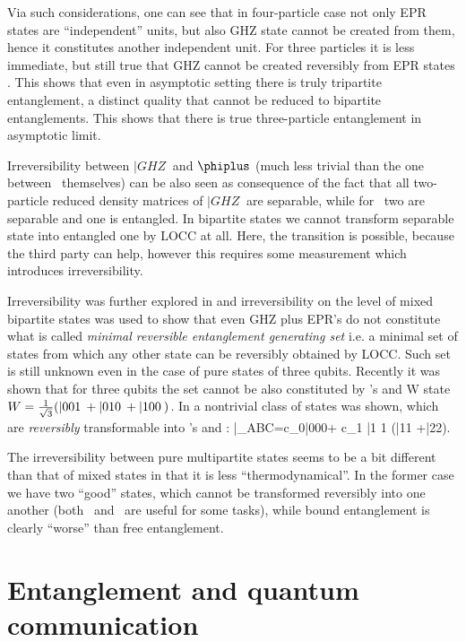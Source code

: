 \documentclass[twocolumn,aps,rmp]{revtex4}
\begin{document}
Via such considerations, one can see that in four-particle case not
only EPR states are ``independent'' units, but also GHZ state cannot
be created from them, hence it constitutes another independent unit.
For three particles it is less immediate, but still true that GHZ
cannot be created reversibly from EPR states \cite{LPSW1999}. This
shows that even in asymptotic setting there is truly tripartite
entanglement, a distinct quality that cannot be reduced to bipartite
entanglements.  This shows that there is true three-particle
entanglement in asymptotic limit.

Irreversibility between $|GHZ\>$  and $\phiplus$ (much less trivial than the one between \eprstates\
themselves) can be also seen as consequence of
the fact that all two-particle reduced density matrices of $|GHZ\>$ are separable,
while for \eprstates\ two are separable and one is entangled.
In bipartite states we cannot transform separable state into entangled one by LOCC
at all. Here, the transition is possible, because the third party can help,
however this requires some measurement which introduces irreversibility.

Irreversibility was further explored in \cite{AcinVC-mregs}
and irreversibility on the level of mixed bipartite states was used
to show that even GHZ plus EPR's do not constitute what is called
{\it minimal reversible entanglement generating set}
\cite{BPRST-mregs} i.e. a minimal set of states from which any other
state can be reversibly obtained  by LOCC. Such set is still unknown
even in the case of pure states of three qubits. Recently it was
shown \cite{IshizakaP-asym} that for three qubits the set cannot be
also constituted by \epr's and W state $W={1\over \sqrt3}(|001\>
+|010\>+|100\>)$. In \cite{VidalDC2000-epr-ghz} a nontrivial class
of states was shown, which are {\it reversibly} transformable into
\epr's and \ghz:
\be |\psi\>_{ABC}=c_0|000\>+ c_1 |1\> {1\over
{}}(|11\> +|22\>). \ee

The irreversibility between pure multipartite states seems to be a
bit different than that of mixed states in that it is less
``thermodynamical''. In the former case we have two ``good'' states,
which cannot be transformed reversibly into one another (both \eprstate\
and \ghzstate\ are useful for some tasks), while bound entanglement is
clearly ``worse'' than free entanglement.


\section{Entanglement and quantum communication \label{sec:communication}}
\end{document}

